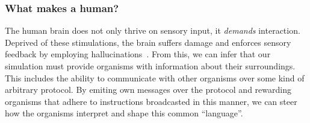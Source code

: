 \subsubsection{What makes a human?}
The human brain does not only thrive on sensory input, it
\emph{demands} interaction. Deprived of these stimulations,
the brain suffers damage and enforces sensory feedback by employing
hallucinations~\cite{Grassian2006}. From this, we can infer that
our simulation must provide organisms with information about their surroundings.
This includes the ability to communicate with other organisms over some
kind of arbitrary protocol. By emiting own messages over the protocol and 
rewarding organisms that adhere to instructions broadcasted in this manner,
we can steer how the organisms interpret and shape this common ``language''.
